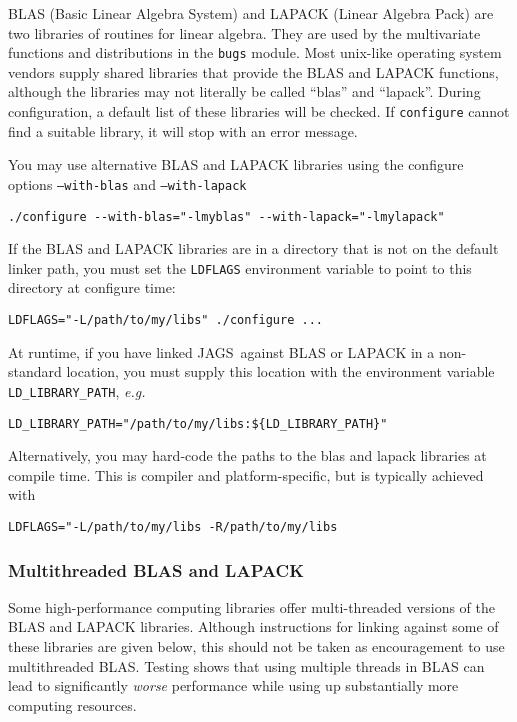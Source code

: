 \documentclass[11pt, a4paper, titlepage]{article}
\newcommand{\JAGS}{\textsf{JAGS}}
\begin{document}
BLAS (Basic Linear Algebra System) and LAPACK (Linear Algebra Pack)
are two libraries of routines for linear algebra. They are used by the
multivariate functions and distributions in the \texttt{bugs} module.
Most unix-like operating system vendors supply shared libraries that
provide the BLAS and LAPACK functions, although the libraries may not
literally be called ``blas'' and ``lapack''.  During configuration, a
default list of these libraries will be checked. If \texttt{configure}
cannot find a suitable library, it will stop with an error message.

You may use alternative BLAS and LAPACK libraries using the configure
options \texttt{--with-blas} and \texttt{--with-lapack}
\begin{verbatim}
./configure --with-blas="-lmyblas" --with-lapack="-lmylapack"
\end{verbatim}

If the BLAS and LAPACK libraries are in a directory that is not on the
default linker path, you must set the \verb+LDFLAGS+ environment variable
to point to this directory at configure time:
\begin{verbatim}
LDFLAGS="-L/path/to/my/libs" ./configure ...
\end{verbatim}

At runtime, if you have linked \JAGS\ against BLAS or LAPACK in
a non-standard location, you must supply this location with the
environment variable \verb+LD_LIBRARY_PATH+, {\em e.g.}
\begin{verbatim}
LD_LIBRARY_PATH="/path/to/my/libs:${LD_LIBRARY_PATH}"
\end{verbatim} %
Alternatively, you may hard-code the paths to the blas and lapack
libraries at compile time. This is compiler and platform-specific,
but is typically achieved with
\begin{verbatim}
LDFLAGS="-L/path/to/my/libs -R/path/to/my/libs
\end{verbatim}

\subsubsection{Multithreaded BLAS and LAPACK}
\label{section:blas:multithreaded}

Some high-performance computing libraries offer multi-threaded
versions of the BLAS and LAPACK libraries. Although instructions for
linking against some of these libraries are given below, this should
not be taken as encouragement to use multithreaded BLAS.  Testing
shows that using multiple threads in BLAS can lead to significantly
{\em worse} performance while using up substantially more computing
resources.
\end{document}
